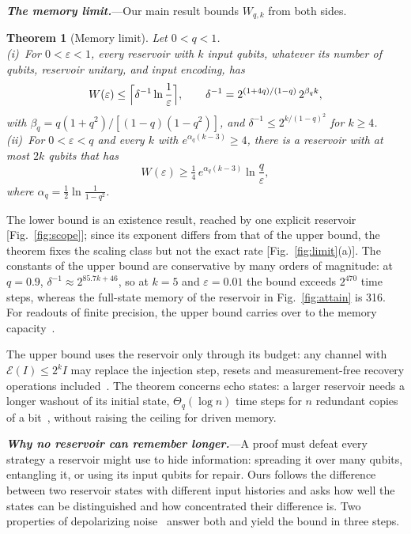 \documentclass[aps,prl,twocolumn,superscriptaddress,floatfix]{revtex4-2}
\theoremstyle{plain}
\newtheorem{theorem}{Theorem}
\newcommand{\cE}{\mathcal E}
\newcommand{\runin}[1]{\textit{\textbf{#1}}---}
\begin{document}
\runin{The memory limit.}Our main result bounds $W_{q,k}$ from both sides.

\begin{theorem}[Memory limit]\label{thm:main}
Let $0<q<1$.\\[2pt]
(i)~For $0<\varepsilon<1$, every reservoir with $k$ input qubits, whatever its number of qubits, reservoir unitary, and input encoding, has
\begin{equation}
W(\varepsilon)\le\Bigl\lceil\delta^{-1}\ln\frac1\varepsilon\Bigr\rceil,\qquad\delta^{-1}=2^{(1+4q)/(1-q)}\,2^{\beta_qk},
\label{eq:upper}
\end{equation}
with $\beta_q=q(1+q^2)/[(1-q)(1-q^2)]$, and \mbox{$\delta^{-1}\le2^{k/(1-q)^2}$} for $k\ge4$.\\[2pt]
(ii)~For $0<\varepsilon<q$ and every $k$ with $e^{\alpha_q(k-3)}\ge4$, there is a reservoir with at most $2k$ qubits that has
\begin{equation}
W(\varepsilon)\ge\tfrac14\,e^{\alpha_q(k-3)}\ln\frac q\varepsilon ,
\label{eq:lower}
\end{equation}
where $\alpha_q=\frac12\ln\frac1{1-q^2}$.
\end{theorem}

The lower bound is an existence result, reached by one explicit reservoir [Fig.~\ref{fig:scope}]; since its exponent differs from that of the upper bound, the theorem fixes the scaling class but not the exact rate [Fig.~\ref{fig:limit}(a)]. The constants of the upper bound are conservative by many orders of magnitude: at $q=0.9$, $\delta^{-1}\approx2^{85.7k+46}$, so at $k=5$ and $\varepsilon=0.01$ the bound exceeds $2^{470}$ time steps, whereas the full-state memory of the reservoir in Fig.~\ref{fig:attain} is 316. For readouts of finite precision, the upper bound carries over to the memory capacity~\cite{Jaeger2002,SM}.

The upper bound uses the reservoir only through its budget: any channel with $\cE(I)\le2^kI$ may replace the injection step, resets and measurement-free recovery operations included~\cite{SM}. The theorem concerns echo states: a larger reservoir needs a longer washout of its initial state, $\Theta_q(\log n)$ time steps for $n$ redundant copies of a bit~\cite{SM}, without raising the ceiling for driven memory.

\runin{Why no reservoir can remember longer.}A proof must defeat every strategy a reservoir might use to hide information: spreading it over many qubits, entangling it, or using its input qubits for repair. Ours follows the difference between two reservoir states with different input histories and asks how well the states can be distinguished and how concentrated their difference is. Two properties of depolarizing noise~\cite{King2014,Cubitt2015} answer both and yield the bound in three steps.
\end{document}
